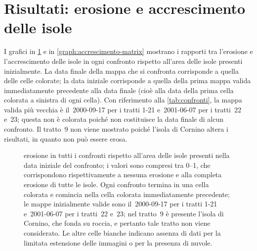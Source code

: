 \section{Risultati: erosione e accrescimento delle isole}
\label{sec:camb-ris}
I grafici in \cref{graph:erosione-matrix} e in \cref{graph:accrescimento-matrix} mostrano i rapporti tra l'erosione e l'accrescimento delle isole in ogni confronto rispetto all'area delle isole presenti inizialmente.
La data finale della mappa che si confronta corrisponde a quella delle celle colorate; la data iniziale corrisponde a quella della prima mappa valida immediatamente precedente alla data finale (cioè alla data della prima cella colorata a sinistra di ogni cella).
Con riferimento alla \cref{tab:confronti}, la mappa valida più vecchia è il~2000-09-17 per i tratti 1-21 e~2001-06-07 per i tratti~22 e~23; questa non è colorata poiché non costituisce la data finale di alcun confronto.
Il tratto~9 non viene mostrato poiché l'isola di Cornino altera i risultati, in quanto non può essere erosa.
%
\begin{figure}
	\centering
	
	\caption[erosione in tutti i confronti rispetto all'area delle isole presenti inizialmente]{erosione in tutti i confronti rispetto all'area delle isole presenti nella data iniziale del confronto; i valori sono compresi tra \numrange[range-phrase = { e }]{0}{1}, che corrispondono rispettivamente a nessuna erosione e alla completa erosione di tutte le isole.
	Ogni confronto termina in una cella colorata e comincia nella cella colorata immediatamente precedente; le mappe inizialmente valide sono il~2000-09-17 per i tratti 1-21 e~2001-06-07 per i tratti~22 e~23; nel tratto~9 è presente l'isola di Cornino, che fonda su roccia, e pertanto tale tratto non viene considerato.
	Le altre celle bianche indicano assenza di dati per la limitata estensione delle immagini o per la presenza di nuvole.}
	\label{graph:erosione-matrix}
\end{figure}
%

